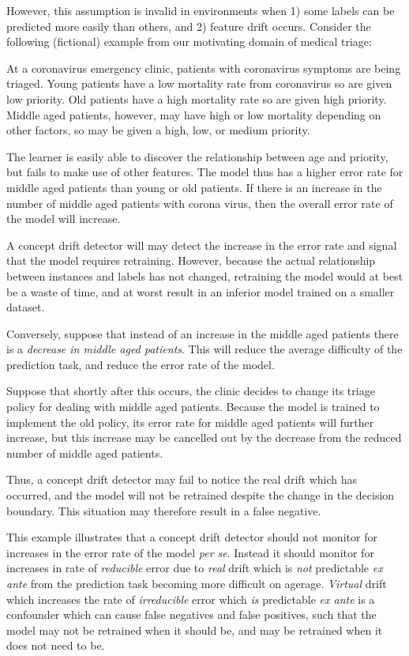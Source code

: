 \noindent However, this assumption is invalid in environments when 1) some labels can be predicted more easily than others, and 2) feature drift occurs. Consider the following (fictional) example from our motivating domain of medical triage:
\begin{displayquote}
    At a coronavirus emergency clinic, patients with coronavirus symptoms are being triaged. Young patients have a low mortality rate from coronavirus so are given low priority. Old patients have a high mortality rate so are given high priority. Middle aged patients, however, may have high or low mortality depending on other factors, so may be given a high, low, or medium priority. 
    
    The learner is easily able to discover the relationship between age and priority, but fails to make use of other features. The model thus has a higher error rate for middle aged patients than young or old patients. If there is an increase in the number of middle aged patients with corona virus, then the overall error rate of the model will increase.  
    
    A concept drift detector will may detect the increase in the error rate and signal that the model requires retraining. However, because the actual relationship between instances and labels has not changed, retraining the model would at best be a waste of time, and at worst result in an inferior model trained on a smaller dataset. 
    
    Conversely, suppose that instead of an increase in the middle aged patients there is a {\it decrease in middle aged patients}. This will reduce the average difficulty of the prediction task, and reduce the error rate of the model. 
    
    Suppose that shortly after this occurs, the clinic decides to change its triage policy for dealing with middle aged patients. Because the model is trained to implement the old policy, its error rate for middle aged patients will further increase, but this increase may be cancelled out by the decrease from the reduced number of middle aged patients. 
    
    Thus, a concept drift detector may fail to notice the real drift which has occurred, and the model will not be retrained despite the change in the decision boundary. This situation may therefore result in a false negative.
\end{displayquote}
This example illustrates that a concept drift detector should not monitor for increases in the error rate of the model {\it per se}. Instead it should monitor for increases in rate of {\it reducible} error due to {\it real} drift which is {\it not} predictable {\it ex ante} from the prediction task becoming more difficult on agerage. {\it Virtual} drift which increases the rate of {\it irreducible} error which {\it is} predictable {\it ex ante} is a confounder which can cause false negatives and false positives, such that the model may not be retrained when it should be, and may be retrained when it does not need to be.

